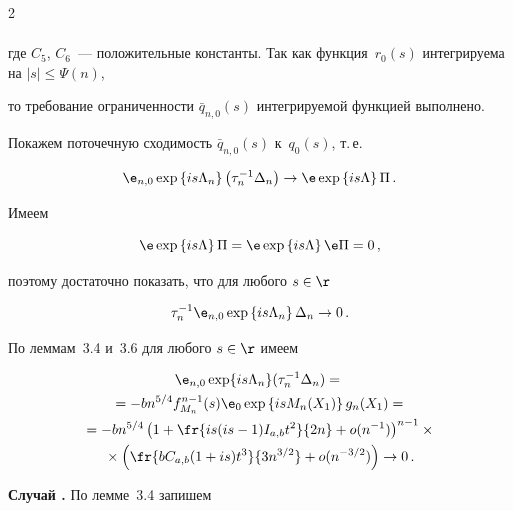 \begin{multicols}{2}
\begin{multline*}
\end{multline*}


где $C_5$, $C_6$~--- положительные константы. Так как функция~$r_0(s)$ интегрируема на $|s|\leq\Psi(n)$, 


то требование ограниченности $\bar{q}_{n,0}(s)$ интегрируемой функцией выполнено. 


Покажем поточечную сходимость $\bar{q}_{n,0}(s)$ к~$q_0(s)$, т.\,е.


$$


{\e}_{n,0} \exp\left\{is\Lambda_n\right\} \left(\tau_n^{-1} \Delta_n\right) \to 


{\e} \exp\left\{is\Lambda\right\} \Pi\,.


$$


Имеем


$$


{\e} \exp\left\{is\Lambda\right\} \Pi = {\e} \exp\left\{is\Lambda\right\} {\e} \Pi = 0\,,


$$


поэтому достаточно показать, что для любого $s\in{\r}$


$$


\tau_n^{-1} {\e}_{n,0} \exp\left\{is\Lambda_n\right\} \Delta_n \to 0\,.


$$


По леммам~3.4 и~3.6 для любого $s\in{\r}$ имеем


\begin{multline*}


{\e}_{n,0}\exp\{is\Lambda_n\}(\tau_n^{-1}\Delta_n) ={}\\


{}= -b n^{5/4} f^{n-1}_{M_n}(s) {\e}_0 \exp\left\{isM_n(X_1)\right\} g_n(X_1) ={}\\


{}


= -b n^{5/4} \left(1+\fr{is(is-1)\iab t^2}{2n}+ o(n^{-1})\right)^{n-1} \times{}\\


{}\times


\left(\fr{b \cab (1+is)t^3}{3n^{3/2}}+  o(n^{-3/2})\right) \to 0\,.


\end{multline*}





\medskip





\noindent


\textbf{Случай {}.} По лемме~3.4 запишем



\end{multicols}
